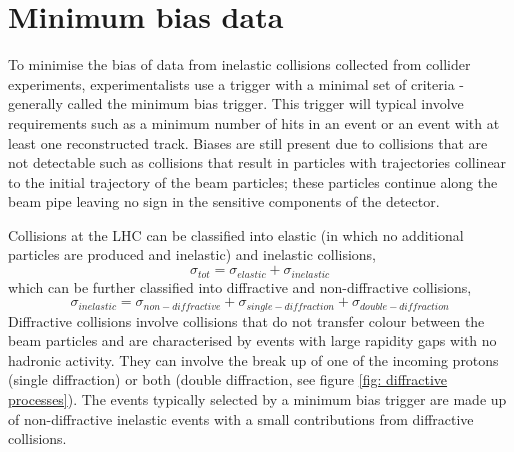 \section{Minimum bias data}

To minimise the bias of data from inelastic collisions collected from collider experiments, experimentalists use a trigger with a minimal set of criteria - generally called the minimum bias trigger. This trigger will typical involve requirements such as a minimum number of hits in an event or an event with at least one reconstructed track. Biases are still present due to collisions that are not detectable such as collisions that result in  particles with trajectories collinear to the initial trajectory of the beam particles; these particles continue along the beam pipe leaving no sign in the sensitive components of the detector. 

Collisions at the LHC can be classified into elastic (in which no additional particles are produced and inelastic) and inelastic collisions,
\begin{equation}
	\sigma_{tot} = \sigma_{elastic} + \sigma_{inelastic}
\end{equation}
which can be further classified into diffractive and non-diffractive collisions,
\begin{equation}
	\sigma_{inelastic} = \sigma_{non-diffractive} + \sigma_{single-diffraction} + \sigma_{double-diffraction}
\end{equation}
Diffractive collisions involve collisions that do not transfer colour between the beam particles and are characterised by events with large rapidity gaps with no hadronic activity. They can involve the break up of one of the incoming protons (single diffraction) or both (double diffraction, see figure \ref{fig: diffractive processes}). The events typically selected by a minimum bias trigger are made up of non-diffractive inelastic events with a small contributions from diffractive collisions.

